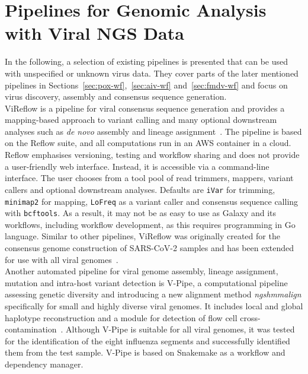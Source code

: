 \section{Pipelines for Genomic Analysis with Viral NGS Data}\label{sec:2-general-pipelines}
In the following, a selection of existing pipelines is presented that can be used with unspecified or unknown virus data. They cover parts of the later mentioned pipelines in Sections~\ref{sec:pox-wf},~\ref{sec:aiv-wf} and~\ref{sec:fmdv-wf} and focus on virus discovery, assembly and consensus sequence generation. \\
ViReflow is a pipeline for viral consensus sequence generation and provides a mapping-based approach to variant calling and many optional downstream analyses such as \textit{de novo} assembly and lineage assignment~\cite{moshiri2022vireflow}. The pipeline is based on the Reflow suite, and all computations run in an AWS container in a cloud. Reflow emphasises versioning, testing and workflow sharing and does not provide a user-friendly web interface. Instead, it is accessible via a command-line interface. The user chooses from a tool pool of read trimmers, mappers, variant callers and optional downstream analyses. Defaults are \texttt{iVar} for trimming, \texttt{minimap2} for mapping, \texttt{LoFreq} as a variant caller and consensus sequence calling with \texttt{bcftools}. As a result, it may not be as easy to use as Galaxy and its workflows, including workflow development, as this requires programming in Go language. Similar to other pipelines, ViReflow was originally created for the consensus genome construction of \ac{SARS-CoV-2} samples and has been extended for use with all viral genomes~\cite{moshiri2022vireflow}. \\
Another automated pipeline for viral genome assembly, lineage assignment, mutation and intra-host variant detection is V-Pipe, a computational pipeline assessing genetic diversity and introducing a new alignment method \textit{ngshmmalign} specifically for small and highly diverse viral genomes. It includes local and global haplotype reconstruction and a module for detection of flow cell cross-contamination~\cite{posada2021v}. Although V-Pipe is suitable for all viral genomes, it was tested for the identification of the eight influenza segments and successfully identified them from the test sample. V-Pipe is based on Snakemake as a workflow and dependency manager. \\
